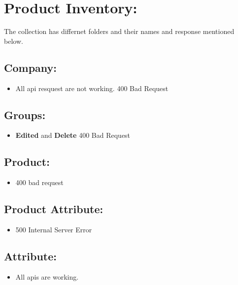 \documentclass[12pt,a4paper]{article}
\begin{document}
	
 
 \clearpage
\section{Product Inventory:}
The collection has differnet folders and their names and response mentioned below.
\subsection{Company:}
\begin{itemize}
    \item All api resquest are not working. 400 Bad Request
\end{itemize}

\subsection{Groups:}
\begin{itemize}
    \item \textbf{Edited} and \textbf{Delete} 400 Bad Request
\end{itemize}

\subsection{Product:}
\begin{itemize}
    \item 400 bad request
\end{itemize}

\subsection{Product Attribute:}
\begin{itemize}
    \item 500 Internal Server Error
\end{itemize}

\subsection{Attribute:}
\begin{itemize}
    \item All apis are working.
\end{itemize}
\end{document}
